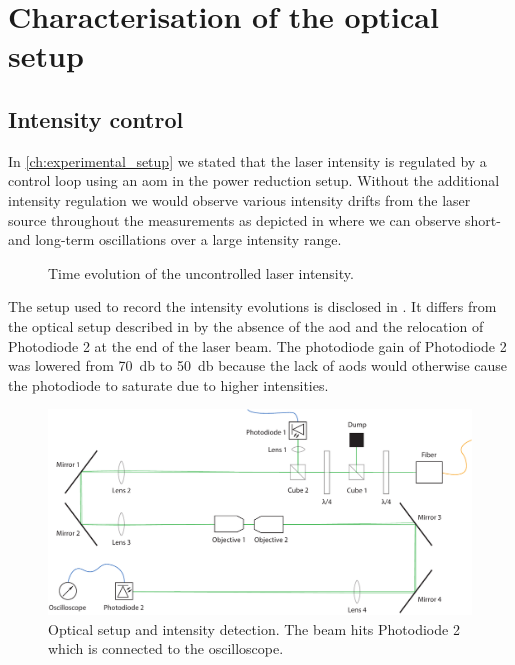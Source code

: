 \chapter{Characterisation of the optical setup}\label{ch:optical_setup}

\section{Intensity control}

In \cref{ch:experimental_setup} we stated that the laser intensity is
regulated by a control loop using an \gls{aom} in the power reduction setup.
Without the additional intensity regulation we would
observe various intensity drifts from the laser source throughout the
measurements as depicted in  where we can
observe short- and long-term oscillations over a large intensity range.
\begin{figure}[htb]
  \centering
  \begin{adjustbox}{width=\textwidth}
    
  \end{adjustbox}
  \caption{Time evolution of the uncontrolled laser intensity.
  }\label{fig:intensity_uncontrolled}
\end{figure}
The setup used to record the intensity evolutions is disclosed in
. It differs from the optical setup
described in  by the absence of the \gls{aod}
and the relocation of Photodiode \num{2} at the end of the laser beam. The
photodiode gain of Photodiode \num{2} was lowered from \SI{70}{\decibel} to
\SI{50}{\decibel} because the lack of \gls{aod}s would otherwise cause the
photodiode to saturate due to higher intensities.
\begin{figure}[htb]
  \centering
  \includegraphics[width=\textwidth]{../media/setup/intensity-control.pdf}
  \caption{Optical setup and intensity detection. The beam hits Photodiode 2
    which is connected to the oscilloscope.
  }\label{fig:intensity_control_setup}
\end{figure}
